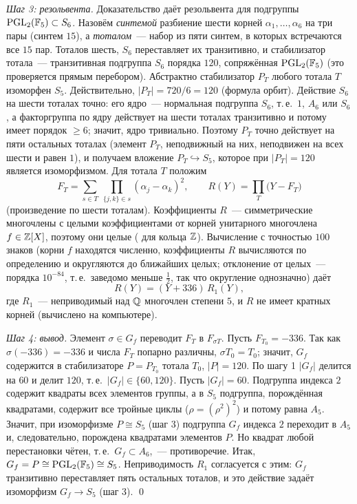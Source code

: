 \emph{Шаг 3: резольвента.} Доказательство даёт резольвента для подгруппы $\mathrm{PGL}_2(\mathbb F_5)\subset S_6$. Назовём
\emph{синтемой} разбиение шести корней $\alpha_1,\dots,\alpha_6$ на три пары (синтем $15$), а \emph{тоталом}~--- набор из пяти синтем,
в которых встречаются все $15$ пар. Тоталов шесть, $S_6$ переставляет их транзитивно, и стабилизатор тотала~--- транзитивная
подгруппа $S_6$ порядка $120$, сопряжённая $\mathrm{PGL}_2(\mathbb F_5)$ (это проверяется прямым перебором). Абстрактно
стабилизатор $P_T$ любого тотала $T$ изоморфен $S_5$. Действительно, $|P_T|=720/6=120$ (формула орбит). Действие $S_6$ на шести
тоталах точно: его ядро~--- нормальная подгруппа $S_6$, т.\,е.\ $1$, $A_6$ или $S_6$, а факторгруппа по ядру действует на
шести тоталах транзитивно и потому имеет порядок $\ge6$; значит, ядро тривиально. Поэтому $P_T$ точно действует на пяти
остальных тоталах (элемент $P_T$, неподвижный на них, неподвижен на всех шести и равен $1$), и получаем вложение
$P_T\hookrightarrow S_5$, которое при $|P_T|=120$ является изоморфизмом. Для тотала $T$ положим
\[
F_T=\sum_{s\in T}\ \prod_{\{j,k\}\in s}(\alpha_j-\alpha_k)^2,\qquad R(Y)=\prod_{T}\bigl(Y-F_T\bigr)
\]
(произведение по шести тоталам). Коэффициенты $R$~--- симметрические многочлены с целыми коэффициентами от корней
унитарного многочлена $f\in\mathbb Z[X]$, поэтому они целые ( для кольца $\mathbb Z$). Вычисление с точностью $100$ знаков (корни $f$ находятся
численно, коэффициенты $R$ вычисляются по определению и округляются до ближайших целых; отклонение от целых~--- порядка
$10^{-84}$, т.\,е.\ заведомо меньше $\tfrac12$, так что округление однозначно) даёт
\[
R(Y)=(Y+336)\,R_1(Y),
\]
где $R_1$~--- неприводимый над $\mathbb Q$ многочлен степени $5$, и $R$ не имеет кратных корней (вычислено на компьютере).

\emph{Шаг 4: вывод.} Элемент $\sigma\in G_f$ переводит $F_T$ в $F_{\sigma T}$. Пусть $F_{T_0}=-336$. Так как $\sigma(-336)=-336$ и
числа $F_T$ попарно различны, $\sigma T_0=T_0$; значит, $G_f$ содержится в стабилизаторе $P=P_{T_0}$ тотала $T_0$, $|P|=120$. По
шагу 1 $|G_f|$ делится на $60$ и делит $120$, т.\,е.\ $|G_f|\in\{60,120\}$. Пусть $|G_f|=60$. Подгруппа индекса $2$ содержит
квадраты всех элементов группы, а в $S_5$ подгруппа, порождённая квадратами, содержит все тройные циклы
($\rho=(\rho^2)^2$) и потому равна $A_5$. Значит, при изоморфизме $P\cong S_5$ (шаг 3) подгруппа $G_f$ индекса $2$ переходит в
$A_5$ и, следовательно, порождена квадратами элементов $P$. Но квадрат любой перестановки чётен, т.\,е.\ $G_f\subset A_6$,~---
противоречие. Итак, $G_f=P\cong\mathrm{PGL}_2(\mathbb F_5)\cong S_5$. Неприводимость $R_1$ согласуется с этим: $G_f$ транзитивно
переставляет пять остальных тоталов, и это действие задаёт изоморфизм $G_f\to S_5$ (шаг 3). \qed

